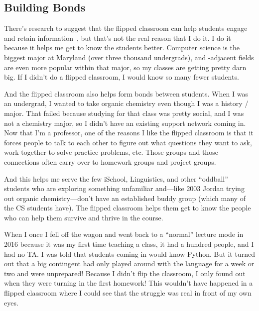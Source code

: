 %

\subsection{Building Bonds}

There's research to suggest that the flipped classroom can help
students engage and retain information~\cite{Zuber-16}, but that's not
the real reason that I do it.
%
I do it because it helps me get to know the students better.  Computer
science is the biggest major at Maryland (over three thousand undergrads), and
-adjacent fields are even more popular within that major, so my
classes are getting pretty darn big.
%
If I didn't do a flipped
classroom, I would know so many fewer students.

And the flipped classroom also helps form bonds between students.
%
When I was an undergrad, I wanted to take organic chemistry even
though I was a history /  major.
%
That failed because studying for
that class was pretty social, and I was not a chemistry major, so I
didn't have an existing support network coming in.
%
Now that I'm a
professor, one of the reasons I like the flipped classroom is that it
forces people to talk to each other to figure out what questions they
want to ask, work together to solve practice problems, etc.
%
Those
groups and those connections often carry over to homework groups and
project groups.

And this helps me serve the few iSchool, Linguistics, and other ``oddball''
students who are exploring something unfamiliar and---like 2003 Jordan trying out
organic chemistry---don't have an established buddy group (which many of the
CS students have).  The flipped classroom helps them get to know the people
who can help them survive and thrive in the course.

When I once I fell off the wagon and went back to a ``normal'' lecture
mode in 2016 because it was my first time teaching a class, it had a
hundred people, and I had no TA.  I was told that students coming in
would know Python.  But it turned out that a big contingent had only
played around with the language for a week or two and were unprepared!
Because I didn't flip the classroom, I only found out when they were turning in the first homework! This wouldn't have happened in a flipped classroom where
I could see that the struggle was real in front of my own eyes.

